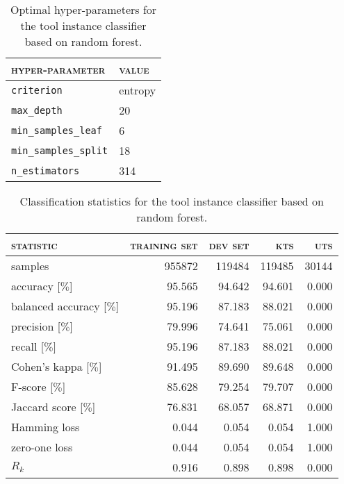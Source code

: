 \begin{table}[H]
	\centering
	\begin{tabular}{ll}
		\toprule
		\textsc{hyper-parameter} & \textsc{value}\\
		\midrule
		\verb|criterion| & entropy\\
		\verb|max_depth| & 20\\
		\verb|min_samples_leaf| & 6\\
		\verb|min_samples_split| & 18\\
		\verb|n_estimators| & 314\\
		\bottomrule
	\end{tabular}
	\caption{Optimal hyper-parameters for the tool instance classifier based on random forest.}
	\label{tab:hyperparameters_application_long_random_forest}
\end{table}
\begin{table}[H]
	\centering
	\begin{tabular}{lrrrr}
		\toprule
		\textsc{statistic} & \textsc{training set} & \textsc{dev set} & \textsc{kts} & \textsc{uts}\\
		\midrule
		samples & 955872 & 119484 & 119485 & 30144\\
		accuracy [$\%$] & 95.565 & 94.642 & 94.601 & 0.000\\
		balanced accuracy [$\%$] & 95.196 & 87.183 & 88.021 & 0.000\\
		precision [$\%$] & 79.996 & 74.641 & 75.061 & 0.000\\
		recall [$\%$] & 95.196 & 87.183 & 88.021 & 0.000\\
		Cohen’s kappa [$\%$] & 91.495 & 89.690 & 89.648 & 0.000\\
		F-score [$\%$] & 85.628 & 79.254 & 79.707 & 0.000\\
		Jaccard score [$\%$] & 76.831 & 68.057 & 68.871 & 0.000\\
		Hamming loss & 0.044 & 0.054 & 0.054 & 1.000\\
		zero-one loss & 0.044 & 0.054 & 0.054 & 1.000\\
		$R_k$ & 0.916 & 0.898 & 0.898 & 0.000\\
		\bottomrule
	\end{tabular}
	\caption{Classification statistics for the tool instance classifier based on random forest.}
	\label{tab:classification_application_long_random_forest}
\end{table}
